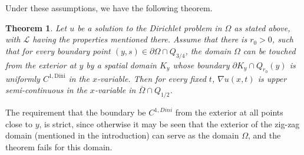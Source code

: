 \documentclass[11pt,reqno]{amsart}
\theoremstyle{plain}
\newtheorem{thm}{Theorem}[section]
\theoremstyle{remark}
\numberwithin{equation}{section}
\begin{document}
Under these assumptions, we have the following theorem.



\begin{thm}\label{thm:bdry}
Let $u$ be a solution to  the  Dirichlet problem in $\Omega$ as stated above, with ${\mathcal L}$ having the properties mentioned there.
Assume that there is $r_0 > 0$, such that 
for every boundary point $(y,s) \in \partial \Omega \cap Q_{3/4}$, 
the domain $\Omega$ can be touched from the exterior at $y$ by a spatial domain 
$K_y$ whose boundary 
$\partial K_y \cap Q_{r_0} (y)$ is uniformly $C^{1,\mathrm{Dini}}$ in the $x$-variable. 
Then  for every fixed $t$, $\nabla u (x,t)$ is upper semi-continuous in the $x$-variable in 
$\overline\Omega \cap Q_{1/2}$.
\end{thm}


The requirement that  the boundary be $C^{1,Dini}$ from the exterior at all points close to $y$, is strict, since otherwise it may be seen that the exterior of the zig-zag domain (mentioned in the introduction) can serve as  the domain $\Omega$, and the theorem fails  for this domain. 
\end{document}

